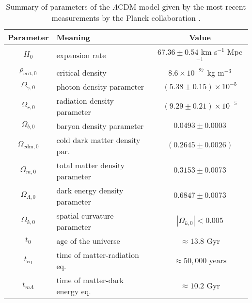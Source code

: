 \begin{table}
    \centering
    \begin{tabular}{c p{6cm} c}
    \hline
    \textbf{Parameter} & \textbf{Meaning} & \textbf{Value} \\ \hline \hline
    $H_0$ & \raggedright expansion rate & $67.36 \pm 0.54$ km s$^{-1}$ Mpc$^{-1}$ \\ 
    $\rho_{\text{crit},0}$ & \raggedright critical density & $8.6 \times 10^{-27}$ kg m$^{-3}$ \\  \hline
    $\Omega_{\gamma,0}$ & \raggedright photon density parameter & $(5.38 \pm 0.15) \times 10^{-5}$ \\ 
    $\Omega_{r,0}$ & \raggedright radiation density parameter & $(9.29 \pm 0.21) \times 10^{-5}$ \\ 
    $\Omega_{b,0}$ & \raggedright baryon density parameter & $0.0493 \pm 0.0003$ \\
    $\Omega_{\text{cdm},0}$ & \raggedright cold dark matter density par. & $(0.2645\pm0.0026)$ \\ 
    $\Omega_{m,0}$ & \raggedright total matter density parameter & $0.3153 \pm 0.0073$ \\ 
    $\Omega_{\Lambda,0}$ & \raggedright dark energy density parameter & $0.6847 \pm 0.0073$ \\ 
    $\Omega_{k,0}$ & \raggedright spatial curvature parameter & $|\Omega_{k,0}| < 0.005$ \\ \hline 
    $t_0$ & \raggedright age of the universe & $\approx 13.8$ Gyr \\ 
    $t_\text{eq}$ & \raggedright time of matter-radiation eq. & $\approx 50,000$ years \\ 
    $t_{m\Lambda}$ & \raggedright time of matter-dark energy eq. & $\approx 10.2$ Gyr \\ \hline
    \end{tabular}
    \caption{Summary of parameters of the $\Lambda$CDM model given by the most recent measurements by the Planck collaboration \cite{planck2018results}.}
    \label{tab:LambdaCDM}
\end{table}

